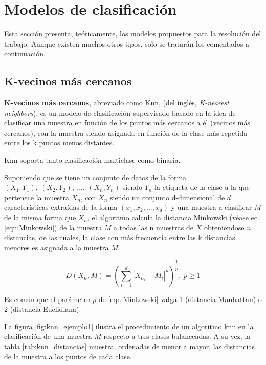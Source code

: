 \section{Modelos de clasificación}

Esta sección presenta, teóricamente, los modelos propuestos para la resolución del trabajo. Aunque existen muchos otros tipos, solo se tratarán los comentados a continuación.


\subsection{K-vecinos más cercanos}

\textbf{K-vecinos más cercanos}, abreviado como Knn, (del inglés, \textit{K-nearest neighbors}), es un modelo de clasificación supervisado basado en la idea de clasificar una muestra en función de los puntos más cercanos a él (vecinos más cercanos), con la muestra siendo asignada en función de la clase más repetida entre los k puntos menos distantes. 

Knn soporta tanto clasificación multiclase como binaria.

Suponiendo que se tiene un conjunto de datos de la forma $\left(X_{1},Y_{1}\right),\:\left(X_{2},Y_{2}\right),\:...,\:\left(X_{n},Y_{n}\right)$ siendo $Y_{n}$ la etiqueta de la clase a la que pertenece la muestra $X_{n}$, con $X_{n}$ siendo un conjunto d-dimensional de $d$ características extraídas de la forma $\left(x_{1},x_{2},...,x_{d}\right)$ y una muestra a clasificar $M$ de la misma forma que $X_{n}$, el algoritmo calcula la distancia Minkowski (véase ec. \ref{eqn:Minkowski}) de la muestra $M$ a todas las n muestras de $X$ obteniéndose $n$ distancias, de las cuales, la clase con más frecuencia entre las k distancias menores es asignada a la muestra $M$.

\begin{equation}
	D\left(X_{n},M\right) = \left(\sum_{i=1}^{d} |X_{n_i}-M_{i}|^{p}\right)^{\dfrac{1}{p}},\:p\geq1
	\label{eqn:Minkowski}
\end{equation}

Es común que el parámetro $p$ de \ref{eqn:Minkowski} valga 1 (distancia Manhattan) o 2 (distancia Euclidiana).

La figura \ref{fig:knn_ejemplo1} ilustra el procedimiento de un algoritmo knn en la clasificación de una muestra $M$ respecto a tres clases balanceadas. A su vez, la tabla \ref{tab:knn_distancias} muestra, ordenadas de menor a mayor, las distancias de la muestra a los puntos de cada clase.

